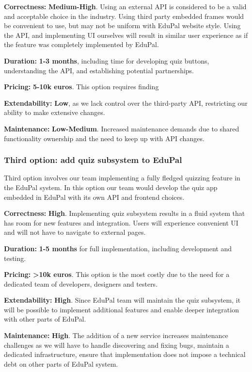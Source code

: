 \documentclass[
    english, %
]{VUMIFPSkursinis}
\begin{document}
\textbf{Correctness:} \textbf{Medium-High}. Using an external API is considered to be a valid and acceptable choice in the industry. Using third party embedded frames would be convenient to use, but may not be uniform with EduPal website style. Using the API, and implementing UI ourselves will result in similar user experience as if the feature was completely implemented by EduPal.

\textbf{Duration:} \textbf{1-3 months}, including time for developing quiz buttons, understanding the API, and establishing potential partnerships.

\textbf{Pricing:} \textbf{5-10k euros}. This option requires finding 

\textbf{Extendability:} \textbf{Low}, as we lack control over the third-party API, restricting our ability to make extensive changes.

\textbf{Maintenance:} \textbf{Low-Medium}. Increased maintenance demands due to shared functionality ownership and the need to keep up with API changes.

\subsubsection{Third option: add quiz subsystem to EduPal}

Third option involves our team implementing a fully fledged quizzing feature in the EduPal system. In this option our team would develop the quiz app embedded in EduPal with its own API and frontend choices.

\textbf{Correctness:} \textbf{High}. Implementing quiz subsystem results in a fluid system that has room for new features and integration. Users will experience convenient UI and will not have to navigate to external pages.

\textbf{Duration:} \textbf{1-5 months} for full implementation, including development and testing.

\textbf{Pricing:} \textbf{>10k euros}. This option is the most costly due to the need for a dedicated team of developers, designers and testers.

\textbf{Extendability:} \textbf{High}. Since EduPal team will maintain the quiz subsystem, it will be possible to implement additional features and enable deeper integration with other parts of EduPal.

\textbf{Maintenance:} \textbf{High}. The addition of a new service increases maintenance challenges as we will have to handle discovering and fixing bugs, maintain a dedicated infrastructure, ensure that implementation does not impose a technical debt on other parts of EduPal system.
\end{document}
